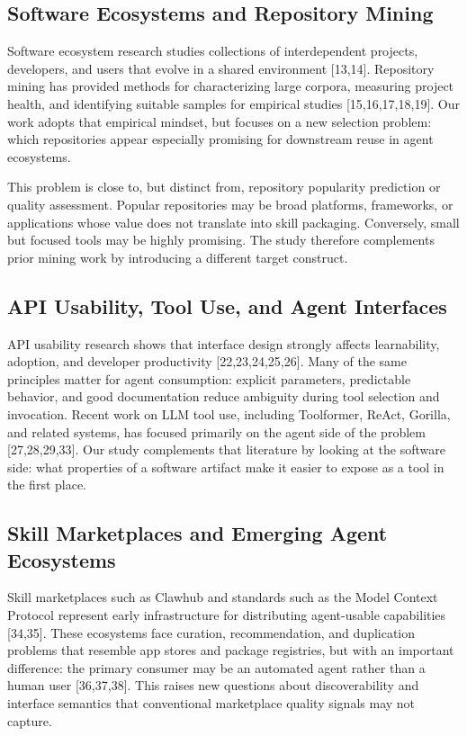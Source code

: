 \documentclass[sigconf,review,anonymous,nonacm]{acmart}
\begin{document}
\subsection{Software Ecosystems and Repository Mining}

Software ecosystem research studies collections of interdependent projects, developers, and users that evolve in a shared environment [13,14]. Repository mining has provided methods for characterizing large corpora, measuring project health, and identifying suitable samples for empirical studies [15,16,17,18,19]. Our work adopts that empirical mindset, but focuses on a new selection problem: which repositories appear especially promising for downstream reuse in agent ecosystems.

This problem is close to, but distinct from, repository popularity prediction or quality assessment. Popular repositories may be broad platforms, frameworks, or applications whose value does not translate into skill packaging. Conversely, small but focused tools may be highly promising. The study therefore complements prior mining work by introducing a different target construct.

\subsection{API Usability, Tool Use, and Agent Interfaces}

API usability research shows that interface design strongly affects learnability, adoption, and developer productivity [22,23,24,25,26]. Many of the same principles matter for agent consumption: explicit parameters, predictable behavior, and good documentation reduce ambiguity during tool selection and invocation. Recent work on LLM tool use, including Toolformer, ReAct, Gorilla, and related systems, has focused primarily on the agent side of the problem [27,28,29,33]. Our study complements that literature by looking at the software side: what properties of a software artifact make it easier to expose as a tool in the first place.

\subsection{Skill Marketplaces and Emerging Agent Ecosystems}

Skill marketplaces such as Clawhub and standards such as the Model Context Protocol represent early infrastructure for distributing agent-usable capabilities [34,35]. These ecosystems face curation, recommendation, and duplication problems that resemble app stores and package registries, but with an important difference: the primary consumer may be an automated agent rather than a human user [36,37,38]. This raises new questions about discoverability and interface semantics that conventional marketplace quality signals may not capture.
\end{document}
